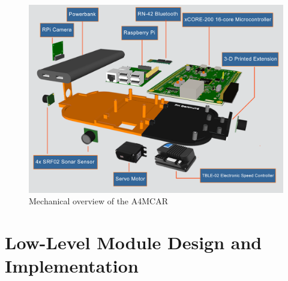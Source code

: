\begin{figure}[!ht]
	\centering
	\captionsetup{justification=centering}
	\includegraphics[scale=0.25]{content/images/mechanicaloverview.png}
	\caption{Mechanical overview of the A4MCAR}
	\label{fig:mechanicaloverview}
\end{figure}

\section{Low-Level Module Design and Implementation}
